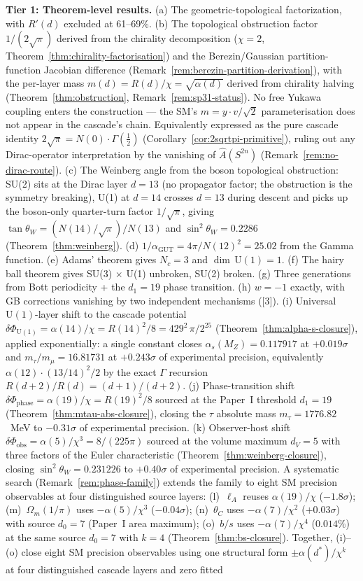 \documentclass[12pt,a4paper]{article}
\begin{document}
\textbf{Tier 1: Theorem-level results.} (a) The geometric-topological factorization, with $R'(d)$ excluded at 61--69\%. (b) The topological obstruction factor $1/(2\sqrt{\pi})$ derived from the chirality decomposition ($\chi = 2$, Theorem~\ref{thm:chirality-factorisation}) and the Berezin/Gaussian partition-function Jacobian difference (Remark~\ref{rem:berezin-partition-derivation}), with the per-layer mass $m(d) = R(d)/\chi = \sqrt{\alpha(d)}$ derived from chirality halving (Theorem~\ref{thm:obstruction}, Remark~\ref{rem:sp31-status}). No free Yukawa coupling enters the construction --- the SM's $m = y\cdot v/\sqrt{2}$ parameterisation does not appear in the cascade's chain. Equivalently expressed as the pure cascade identity $2\sqrt{\pi} = N(0)\cdot\Gamma(\tfrac{1}{2})$ (Corollary~\ref{cor:2sqrtpi-primitive}), ruling out any Dirac-operator interpretation by the vanishing of $\hat A(S^{2n})$ (Remark~\ref{rem:no-dirac-route}). (c) The Weinberg angle from the boson topological obstruction: SU(2) sits at the Dirac layer $d=13$ (no propagator factor; the obstruction is the symmetry breaking), U(1) at $d=14$ crosses $d=13$ during descent and picks up the boson-only quarter-turn factor $1/\sqrt{\pi}$, giving $\tan\theta_W = (N(14)/\sqrt{\pi})/N(13)$ and $\sin^2\theta_W = 0.2286$ (Theorem~\ref{thm:weinberg}). (d) $1/\alpha_{\text{GUT}} = 4\pi/N(12)^2 = 25.02$ from the Gamma function. (e) Adams' theorem gives $N_c = 3$ and $\dim\,\text{U}(1) = 1$. (f) The hairy ball theorem gives SU(3) $\times$ U(1) unbroken, SU(2) broken. (g) Three generations from Bott periodicity + the $d_1 = 19$ phase transition. (h) $w = -1$ exactly, with GB corrections vanishing by two independent mechanisms ([3]). (i) Universal $\mathrm{U}(1)$-layer shift to the cascade potential $\delta\Phi_{\mathrm{U}(1)}=\alpha(14)/\chi=R(14)^2/8=429^2\,\pi/2^{25}$ (Theorem~\ref{thm:alpha-s-closure}), applied exponentially: a single constant closes $\alpha_s(M_Z)=0.117917$ at $+0.019\sigma$ and $m_\tau/m_\mu=16.81731$ at $+0.243\sigma$ of experimental precision, equivalently $\alpha(12)\cdot(13/14)^2/2$ by the exact $\Gamma$ recursion $R(d+2)/R(d)=(d+1)/(d+2)$. (j) Phase-transition shift $\delta\Phi_{\mathrm{phase}}=\alpha(19)/\chi=R(19)^2/8$ sourced at the Paper~I threshold $d_1=19$ (Theorem~\ref{thm:mtau-abs-closure}), closing the $\tau$ absolute mass $m_\tau=1776.82$~MeV to $-0.31\sigma$ of experimental precision. (k) Observer-host shift $\delta\Phi_{\mathrm{obs}}=\alpha(5)/\chi^3=8/(225\pi)$ sourced at the volume maximum $d_V=5$ with three factors of the Euler characteristic (Theorem~\ref{thm:weinberg-closure}), closing $\sin^2\theta_W=0.231226$ to $+0.40\sigma$ of experimental precision. A systematic search (Remark~\ref{rem:phase-family}) extends the family to eight SM precision observables at four distinguished source layers: (l)~$\ell_A$ reuses $\alpha(19)/\chi$ ($-1.8\sigma$); (m)~$\Omega_m(1/\pi)$ uses $-\alpha(5)/\chi^3$ ($-0.04\sigma$); (n)~$\theta_C$ uses $-\alpha(7)/\chi^2$ ($+0.03\sigma$) with source $d_0=7$ (Paper~I area maximum); (o)~$b/s$ uses $-\alpha(7)/\chi^4$ ($0.014\%$) at the same source $d_0=7$ with $k=4$ (Theorem~\ref{thm:bs-closure}). Together, (i)--(o) close eight SM precision observables using one structural form $\pm\alpha(d^*)/\chi^k$ at four distinguished cascade layers and zero fitted 
\end{document}
